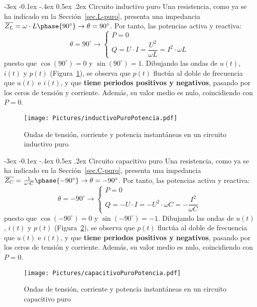 \documentclass[11pt]{book} %
\makeatletter
\numberwithin{dummy}{section}
\theoremstyle{ocrenumbox}
\theoremstyle{blacknumex}
\theoremstyle{blacknumbox}
\theoremstyle{ocrenum}
\renewcommand{\subsection}{\@startsection {subsection}{2}{\z@}
{-3ex \@plus -0.1ex \@minus -.4ex}
{0.5ex \@plus.2ex }
{\normalfont\sffamily\bfseries}}
\makeatother
\begin{document}
	\subsection{Circuito inductivo puro}\label{sec.potencia_L}
	Una resistencia, como ya se ha indicado en la Sección~\ref{sec.L-puro}, presenta una impedancia $\overline{Z_L}=\omega\cdot L\phase{90^\circ}\rightarrow \theta=90^\circ$. Por tanto, las potencias activa y reactiva: 
	\begin{equation}
		\theta = 90^\circ \rightarrow
		\boxed{\begin{cases}
				P = 0\\
				Q = U\cdot I = \dfrac{U^2}{\omega L} = I^2\cdot  \omega L
		\end{cases}}
	\end{equation}
	puesto que $\cos(90^\circ)=0$ y $\sin(90^\circ)=1$. Dibujando las ondas de $u(t)$, $i(t)$ y $p(t)$ (Figura~\ref{fig.inductivoPotencia}), se observa que $p(t)$ fluctúa al doble de frecuencia que $u(t)$ e $i(t)$, y que \textbf{tiene periodos positivos y negativos}, pasando por los ceros de tensión y corriente. Además, su valor medio es nulo, coincidiendo con $P=0$.
	\begin{figure}[htbp]
		\centering
		\texttt{[image: Pictures/inductivoPuroPotencia.pdf]}
		\caption{Ondas de tensión, corriente y potencia instantáneas en un circuito inductivo puro}
		\label{fig.inductivoPotencia}
	\end{figure}
	
	\subsection{Circuito capacitivo puro}\label{sec.potencia_C}
	Una resistencia, como ya se ha indicado en la Sección~\ref{sec.C-puro}, presenta una impedancia $\overline{Z_C}=\frac{1}{\omega\cdot C}\phase{-90^\circ}\rightarrow \theta=-90^\circ$. Por tanto, las potencias activa y reactiva: 
	\begin{equation}
		\theta = -90^\circ \rightarrow
		\boxed{\begin{cases}
				P = 0\\
				Q = -U\cdot I = -U^2\cdot \omega C = -\dfrac{I^2}{\omega C}
		\end{cases}}
	\end{equation}
	puesto que $\cos(-90^\circ)=0$ y $\sin(-90^\circ)=-1$. Dibujando las ondas de $u(t)$, $i(t)$ y $p(t)$ (Figura~\ref{fig.capacitivoPotencia}), se observa que $p(t)$ fluctúa al doble de frecuencia que $u(t)$ e $i(t)$, y que \textbf{tiene periodos positivos y negativos}, pasando por los ceros de tensión y corriente. Además, su valor medio es nulo, coincidiendo con $P=0$.
	\begin{figure}[htbp]
		\centering
		\texttt{[image: Pictures/capacitivoPuroPotencia.pdf]}
		\caption{Ondas de tensión, corriente y potencia instantáneas en un circuito capacitivo puro}
		\label{fig.capacitivoPotencia}
	\end{figure}
	
\end{document}
